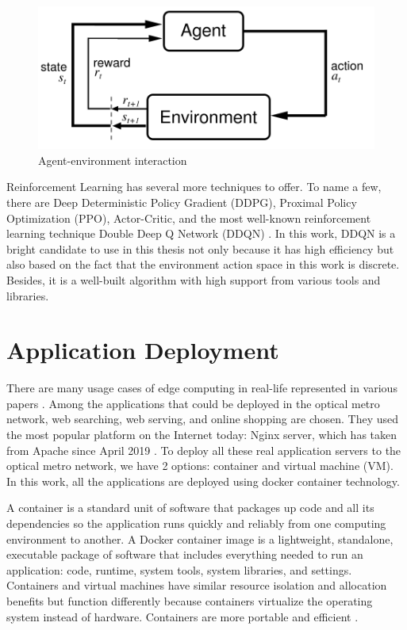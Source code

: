 \documentclass[conference]{IEEEtran}
\begin{document}
\begin{figure}[]
\centering
    \includegraphics[scale = 0.7]{imgs/DRL.png}
    \caption{Agent-environment interaction}
    \label{fig:RL_overview}
\end{figure}

Reinforcement Learning has several more techniques to offer. To name a few, there are Deep Deterministic Policy Gradient (DDPG), Proximal Policy Optimization (PPO), Actor-Critic, and the most well-known reinforcement learning technique Double Deep Q Network (DDQN) \cite{Mnih2015}. In this work, DDQN is a bright candidate to use in this thesis not only because it has high efficiency but also based on the fact that the environment action space in this work is discrete. Besides, it is a well-built algorithm with high support from various tools and libraries.



\section{Application Deployment}
\label{sec:Application Deployment}

There are many usage cases of edge computing in real-life represented in various papers \cite{International2017, 7469991, Shi2016}. Among the applications that could be deployed in the optical metro network, web searching, web serving, and online shopping are chosen. They used the most popular platform on the Internet today: Nginx server, which has taken from Apache since April 2019 \cite{netcraft_news_2021}. To deploy all these real application servers to the optical metro network, we have 2 options: container and virtual machine (VM). In this work, all the applications are deployed using docker container technology. 

A container is a standard unit of software that packages up code and all its dependencies so the application runs quickly and reliably from one computing environment to another. A Docker container image is a lightweight, standalone, executable package of software that includes everything needed to run an application: code, runtime, system tools, system libraries, and settings. Containers and virtual machines have similar resource isolation and allocation benefits but function differently because containers virtualize the operating system instead of hardware. Containers are more portable and efficient \cite{7036275}.
\end{document}
